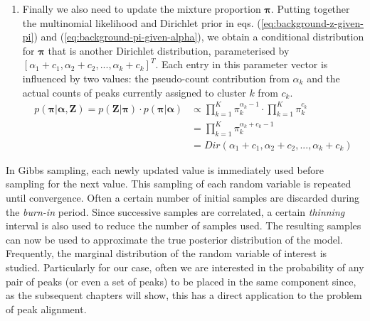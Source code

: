 \begin{enumerate}
\item Finally we also need to update the mixture proportion $\boldsymbol{\pi}$. Putting together the multinomial likelihood and Dirichlet prior in eqs. (\ref{eq:background-z-given-pi}) and (\ref{eq:background-pi-given-alpha}), we obtain a conditional distribution for $\boldsymbol{\pi}$ that is another Dirichlet distribution, parameterised by $[\alpha_{1}+c_{1}, \alpha_{2}+c_{2}, ..., \alpha_{k}+c_{k}]^T$. Each entry in this parameter vector is influenced by two values: the pseudo-count contribution from $\alpha_k$ and the actual counts of peaks currently assigned to cluster $k$ from $c_k$. 
\begin{equation}
\begin{aligned}
p(\boldsymbol{\pi} \vert \boldsymbol{\alpha}, \boldsymbol{Z}) = p(\boldsymbol{Z} \vert \boldsymbol{\pi}) \cdot p(\boldsymbol{\pi} \vert \boldsymbol{\alpha})
                                                                                                &\propto \prod_{k=1}^{K} \pi_k^{\alpha_{k}-1} \cdot \prod_{k=1}^{K} \pi_k^{c_{k}}  \\
                                                                                                &= \prod_{k=1}^{K} \pi_k^{\alpha_{k}+c_{k}-1} \\
                                                                                                &= Dir(\alpha_{1}+c_{1}, \alpha_{2}+c_{2}, ..., \alpha_{k}+c_{k})
\end{aligned}
\label{eq:background-mixture-conditional-pi}
\end{equation}

\end{enumerate}

In Gibbs sampling, each newly updated value is immediately used before sampling for the next value. This sampling of each random variable is repeated until convergence. Often a certain number of initial samples are discarded during the \emph{burn-in} period. Since successive samples are correlated, a certain \emph{thinning} interval is also used to reduce the number of samples used. The resulting samples can now be used to approximate the true posterior distribution of the model. Frequently, the marginal distribution of the random variable of interest is studied. Particularly for our case, often we are interested in the probability of any pair of peaks (or even a set of peaks) to be placed in the same component since, as the subsequent chapters will show, this has a direct application to the problem of peak alignment.

